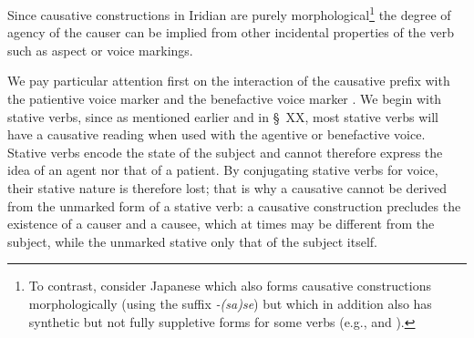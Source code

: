 Since causative constructions in Iridian are purely morphological\footnote{To contrast, consider Japanese which also forms causative constructions morphologically (using the suffix \emph{-(sa)se}) but which in addition also has synthetic but not fully suppletive forms for some verbs (e.g.,  and ).} the degree of agency of the causer can be implied from other incidental properties of the verb such as aspect or voice markings.

We pay particular attention first on the interaction of the causative prefix  with the patientive voice marker  and the benefactive voice marker . We begin with stative verbs, since as mentioned earlier and in \S~XX, most stative verbs will have a causative reading when used with the agentive or benefactive voice. Stative verbs encode the state of the subject and cannot therefore express the idea of an agent nor that of a patient. By conjugating stative verbs for voice, their stative nature is therefore lost; that is why a causative cannot be derived from the unmarked form of a stative verb: a causative construction precludes the existence of a causer and a causee, which at times may be different from the subject, while the unmarked stative only that of the subject itself.


